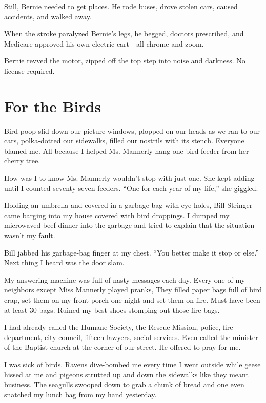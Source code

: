 \documentclass[twoside,10pt]{book}
\begin{document}
Still, Bernie needed to get places. He rode buses, drove stolen cars,
caused accidents, and walked away.

When the stroke paralyzed Bernie's legs, he begged, doctors prescribed,
and Medicare approved his own electric cart---all chrome and zoom.

Bernie revved the motor, zipped off the top step into noise and
darkness. No license required.



\cleardoublepage
\chapter{For the Birds}

Bird poop slid down our picture windows, plopped on our heads as we ran
to our cars, polka-dotted our sidewalks, filled our nostrils with its
stench. Everyone blamed me. All because I helped Ms. Mannerly hang one
bird feeder from her cherry tree.

How was I to know Ms. Mannerly wouldn't stop with just one. She kept
adding until I counted seventy-seven feeders. ``One for each year of my
life,'' she giggled.

Holding an umbrella and covered in a garbage bag with eye holes, Bill
Stringer came barging into my house covered with bird droppings. I
dumped my microwaved beef dinner into the garbage and tried to explain
that the situation wasn't my fault.

Bill jabbed his garbage-bag finger at my chest. ``You better make it
stop or else.'' Next thing I heard was the door slam.

My answering machine was full of nasty messages each day. Every one of
my neighbors except Miss Mannerly played pranks, They filled paper bags
full of bird crap, set them on my front porch one night and set them on
fire. Must have been at least 30 bags. Ruined my best shoes stomping out
those fire bags.

I had already called the Humane Society, the Rescue Mission, police,
fire department, city council, fifteen lawyers, social services. Even
called the minister of the Baptist church at the corner of our street.
He offered to pray for me.

I was sick of birds. Ravens dive-bombed me every time I went outside
while geese hissed at me and pigeons strutted up and down the sidewalks
like they meant business. The seagulls swooped down to grab a chunk of
bread and one even snatched my lunch bag from my hand yesterday.
\end{document}
